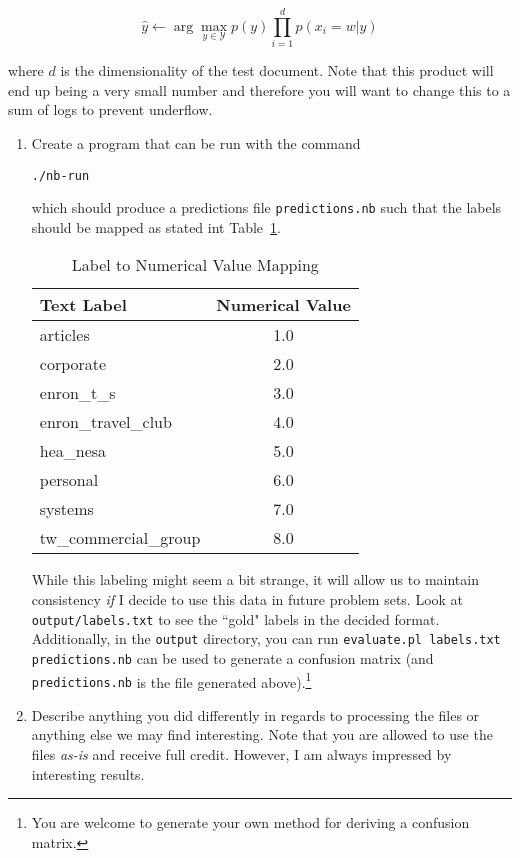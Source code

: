 \documentclass[12pt,letterpaper]{article}
\begin{document}
\begin{enumerate}
$$\hat{y} \leftarrow \arg\max_{y \in \mathcal{Y}} p(y) \prod_{i=1}^{d} p(x_i = w | y)$$

where $d$ is the dimensionality of the test document.  Note that this product will end up being a very small number and therefore you will want to change this to a sum of logs to prevent underflow. 

\begin{enumerate}
\item
Create a program that can be run with the command

{\tt ./nb-run}

which should produce a predictions file {\tt predictions.nb} such that the labels should be mapped as stated int Table~\ref{table:mapping}.

\begin{table}[htb]
\centering
\begin{tabular}{|l|c|}
\hline
Text Label & Numerical Value \\
\hline
articles & 1.0 \\
corporate & 2.0 \\
enron\_t\_s & 3.0 \\
enron\_travel\_club & 4.0 \\ 
hea\_nesa & 5.0 \\
personal & 6.0 \\
systems & 7.0 \\
tw\_commercial\_group & 8.0 \\
\hline
\end{tabular}
\caption{Label to Numerical Value Mapping}
\label{table:mapping}
\end{table}

While this labeling might seem a bit strange, it will allow us to maintain consistency {\em if} I decide to use this data in future problem sets.  Look at {\tt output/labels.txt} to see the ``gold" labels in the decided format.  Additionally, in the {\tt output} directory, you can run {\tt evaluate.pl labels.txt predictions.nb} can be used to generate a confusion matrix (and {\tt predictions.nb} is the file generated above).\footnote{You are welcome to generate your own method for deriving a confusion matrix.}

\item
Describe anything you did differently in regards to processing the files or anything else we may find interesting.  Note that you are allowed to use the files {\em as-is} and receive full credit.  However, I am always impressed by interesting results.


\end{enumerate}
\end{enumerate}
\end{document}
